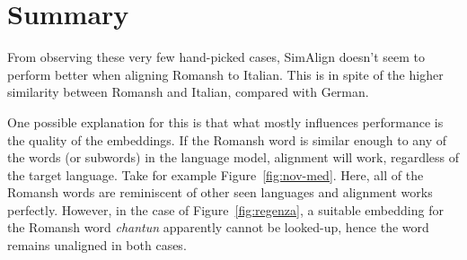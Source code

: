 \section{Summary}
From observing these very few hand-picked cases, SimAlign doesn't seem to perform better when aligning Romansh to Italian. 
This is in spite of the higher similarity between Romansh and Italian, compared with German. 

One possible explanation for this is that what mostly influences performance is the quality of the embeddings. 
If the Romansh word is similar enough to any of the words (or subwords) in the language model, alignment will work, regardless of the target language. Take for example Figure~\ref{fig:nov-med}. 
Here, all of the Romansh words are reminiscent of other seen languages and alignment works perfectly. 
However, in the case of Figure~\ref{fig:regenza}, a suitable embedding for the Romansh word \emph{chantun} apparently cannot be looked-up, hence the word remains unaligned in both cases.


